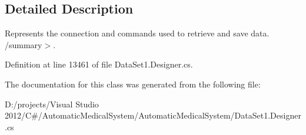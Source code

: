 \subsection{Detailed Description}
Represents the connection and commands used to retrieve and save data. /summary$>$. 

Definition at line 13461 of file DataSet1.Designer.cs.

The documentation for this class was generated from the following file:\begin{CompactItemize}
\item 
D:/projects/Visual Studio 2012/C\#/AutomaticMedicalSystem/AutomaticMedicalSystem/DataSet1.Designer.cs\end{CompactItemize}
